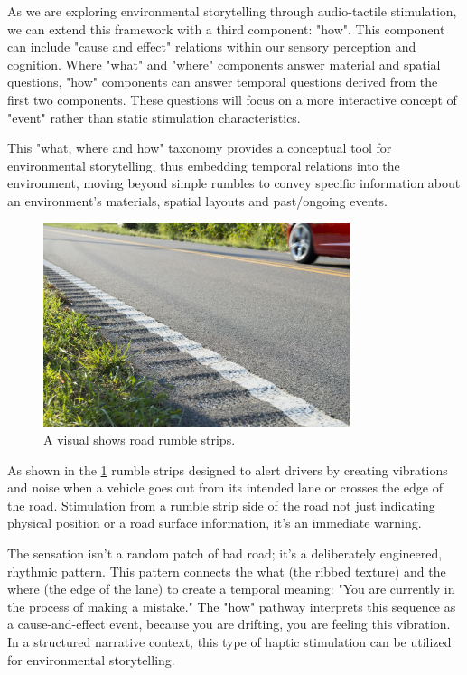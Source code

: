             As we are exploring environmental storytelling through audio-tactile stimulation, we can extend this framework with a third component: "how". This component can include "cause and effect" relations within our sensory perception and cognition. Where "what" and "where" components answer material and spatial questions, "how" components can answer temporal questions derived from the first two components. These questions will focus on a more interactive concept of "event" rather than static stimulation characteristics.\par

            This "what, where and how" taxonomy provides a conceptual tool for environmental storytelling, thus embedding temporal relations into the environment, moving beyond simple rumbles to convey specific information about an environment's materials, spatial layouts and past/ongoing events.\par

            \begin{figure}[H]
                \centering
                \includegraphics[width=0.8\textwidth]{images/rumble_strips.jpg}
                \caption{A visual shows road rumble strips.}
                \label{fig:RUMBLE_STRIP}
            \end{figure}

            As shown in the \ref{fig:RUMBLE_STRIP} rumble strips designed to alert drivers by creating vibrations and noise when a vehicle goes out from its intended lane or crosses the edge of the road. Stimulation from a rumble strip side of the road not just indicating physical position or a road surface information, it's an immediate warning.\par

            The sensation isn't a random patch of bad road; it's a deliberately engineered, rhythmic pattern. This pattern connects the what (the ribbed texture) and the where (the edge of the lane) to create a temporal meaning: "You are currently in the process of making a mistake." The "how" pathway interprets this sequence as a cause-and-effect event, because you are drifting, you are feeling this vibration. In a structured narrative context, this type of haptic stimulation can be utilized for environmental storytelling.\par
